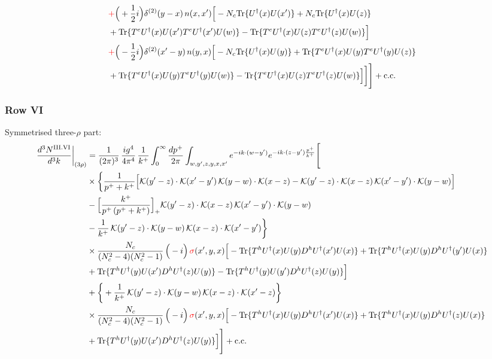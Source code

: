 \documentclass[9pt]{article}
\numberwithin{equation}{section}
\begin{document}
\begin{align}
& {\color{red}+}\Big(+\frac{1}{2}i\Big)\delta^{(2)}(y-x)\,n(x,x')\Big[-N_{c}{\rm Tr}\{U^{\dagger}(x)U(x')\}+N_{c}{\rm Tr}\{U^{\dagger}(x)U(z)\}\notag\\
& +{\rm Tr}\{T^{e}U^{\dagger}(x)U(x')T^{e}U^{\dagger}(x')U(w)\}-{\rm Tr}\{T^{e}U^{\dagger}(x)U(z)T^{e}U^{\dagger}(z)U(w)\}\Big]\notag\\
& {\color{red}+}\Big(-\frac{1}{2}i\Big)\delta^{(2)}(x'-y)\,n(y,x)\Big[-N_{c}{\rm Tr}\{U^{\dagger}(x)U(y)\}+{\rm Tr}\{T^{e}U^{\dagger}(x)U(y)T^{e}U^{\dagger}(y)U(z)\}\notag\\
& +{\rm Tr}\{T^{e}U^{\dagger}(x)U(y)T^{e}U^{\dagger}(y)U(w)\}-{\rm Tr}\{T^{e}U^{\dagger}(x)U(z)T^{e}U^{\dagger}(z)U(w)\}\Big]\bigg]\Bigg]+{\rm c.c.}\label{eq:E-III.V-2}
\end{align}
\subsubsection*{Row VI}
Symmetrised three-$\rho$ part:
\begin{align}
\frac{d^{3}N^{\rm III.VI}}{d^{3}k}\bigg|_{(3\rho)}&=\frac{1}{(2\pi)^{3}}\,\frac{ig^{4}}{4\pi^{4}}\,\frac{1}{k^{+}}\int_{0}^{\infty}\frac{dp^{+}}{2\pi}\int_{w,y',z,y,x,x'}e^{-ik\cdot(w-y')}e^{-ik\cdot(z-y')\frac{p^{+}}{k^{+}}}\Bigg[\notag\\
&\times\bigg\{\frac{1}{p^{+}+k^{+}}\Big[\mathcal{K}(y'-z)\cdot\mathcal{K}(x'-y')\,\mathcal{K}(y-w)\cdot\mathcal{K}(x-z)-\mathcal{K}(y'-z)\cdot\mathcal{K}(x-z)\,\mathcal{K}(x'-y')\cdot\mathcal{K}(y-w)\Big]\notag\\
&-\Big[\frac{k^{+}}{p^{+}\,(p^{+}+k^{+})}\Big]_{+}\mathcal{K}(y'-z)\cdot\mathcal{K}(x-z)\,\mathcal{K}(x'-y')\cdot\mathcal{K}(y-w)\notag\\
&-\frac{1}{k^{+}}\,\mathcal{K}(y'-z)\cdot\mathcal{K}(y-w)\,\mathcal{K}(x-z)\cdot\mathcal{K}(x'-y')\bigg\}\notag\\
&\times \frac{N_{c}}{(N_{c}^{2}-4)(N_{c}^{2}-1)}\,\Big(-i\Big)\,{\color{red}\sigma}(x',y,x)\Big[-{\rm Tr}\{T^{h}U^{\dagger}(x)U(y)D^{h}U^{\dagger}(x')U(x)\}+{\rm Tr}\{T^{h}U^{\dagger}(x)U(y)D^{h}U^{\dagger}(y')U(x)\}\notag\\
& +{\rm Tr}\{T^{h}U^{\dagger}(y)U(x')D^{h}U^{\dagger}(z)U(y)\}-{\rm Tr}\{T^{h}U^{\dagger}(y)U(y')D^{h}U^{\dagger}(z)U(y)\}\Big]\notag\\
&+\bigg\{+\frac{1}{k^{+}}\,\mathcal{K}(y'-z)\cdot\mathcal{K}(y-w)\,\mathcal{K}(x-z)\cdot\mathcal{K}(x'-z)\bigg\}\notag\\
&\times \frac{N_{c}}{(N_{c}^{2}-4)(N_{c}^{2}-1)}\,\Big(-i\Big)\,{\color{red}\sigma}(x',y,x)\Big[-{\rm Tr}\{T^{h}U^{\dagger}(x)U(y)D^{h}U^{\dagger}(x')U(x)\}+{\rm Tr}\{T^{h}U^{\dagger}(x)U(y)D^{h}U^{\dagger}(z)U(x)\}\notag\\
& +{\rm Tr}\{T^{h}U^{\dagger}(y)U(x')D^{h}U^{\dagger}(z)U(y)\}\Big]\Bigg]+{\rm c.c.}\label{eq:E-III.VI-3}
\end{align}
\end{document}
